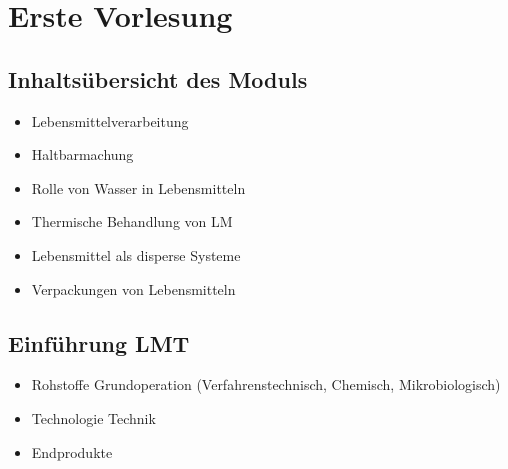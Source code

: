 \documentclass[a4paper,10pt]{article}
\begin{document}
\sidebar
{}
\par \vspace*{5mm}


\section{Erste Vorlesung}
\subsection{Inhaltsübersicht des Moduls}
\begin{itemize}
\item Lebensmittelverarbeitung
\item Haltbarmachung
\item Rolle von Wasser in Lebensmitteln
\item Thermische Behandlung von LM 
\item Lebensmittel als disperse Systeme
\item Verpackungen von Lebensmitteln
\end{itemize}



\subsection{Einführung LMT}
\begin{itemize}
\item Rohstoffe \RA Grundoperation (Verfahrenstechnisch, Chemisch, Mikrobiologisch)
\item Technologie \RA Technik
\item Endprodukte
\end{itemize}
\end{document}
